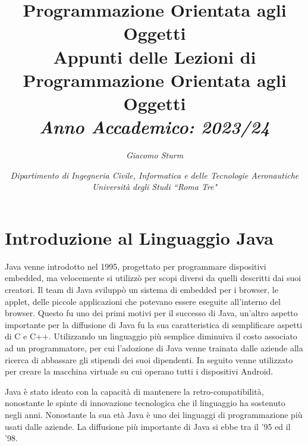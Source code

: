 \documentclass{article}
\numberwithin{equation}{subsection}
\begin{document}
\title{%
    \textbf{Programmazione Orientata agli Oggetti}  \\ 
    \large Appunti delle Lezioni di Programmazione Orientata agli Oggetti \\
    \textit{Anno Accademico: 2023/24}}
\author{\textit{Giacomo Sturm}}
\date{\textit{Dipartimento di Ingegneria Civile, Informatica e delle Tecnologie Aeronautiche \\
Università degli Studi ``Roma Tre"}}

\maketitle
\thispagestyle{link}

\clearpage

\pagestyle{fancy}
\fancyhead{}\fancyfoot{}
\fancyfoot[C]{\thepage}

\tableofcontents

\clearpage




\section{Introduzione al Linguaggio Java}

Java venne introdotto nel 1995, progettato per programmare dispositivi embedded, ma velocemente si utilizzò per scopi diversi da quelli descritti dai suoi 
creatori. Il team di Java sviluppò un sistema di embedded per i browser, le applet, delle piccole applicazioni che potevano essere eseguite all'interno 
del browser. Questo fu uno dei primi motivi per il successo di Java, un'altro aspetto importante per la diffusione di Java fu la sua caratteristica di 
semplificare aspetti di C e C++. Utilizzando un linguaggio più semplice diminuiva il costo associato ad un programmatore, per cui l'adozione di Java 
venne trainata dalle aziende alla ricerca di abbassare gli stipendi dei suoi dipendenti. In seguito venne utilizzato per creare la macchina virtuale su 
cui operano tutti i dispositivi Android. 

Java è stato ideato con la capacità di mantenere la retro-compatibilità, nonostante le spinte di innovazione tecnologica che il linguaggio ha sostenuto 
negli anni. Nonostante la sua età Java è uno dei linguaggi di programmazione più usati dalle aziende. 
La diffusione più importante di Java si ebbe tra il '95 ed il '98. 
\end{document}
